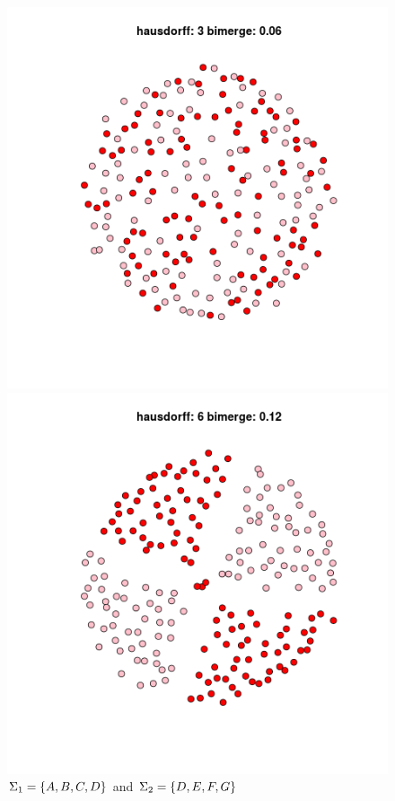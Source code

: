 \begin{figure}
\centering
\begin{minipage}{0.45\textwidth}
\centering
  \includegraphics[scale=0.5]{images/AD6-AD6-100-IM.png}
  \caption{\(\Sigma_1 = \Sigma_2 = \braces{A, B, C, D}\)}
  \label{ad6ad6}
\end{minipage}
\begin{minipage}{0.45\textwidth}
\centering
  \includegraphics[scale=0.5]{images/AD6-DG6-100-IM.png}
  \caption{\(\Sigma_1 = \left\{A, B, C, D\right\}\) and
            \(\Sigma_2 = \left\{D, E, F, G\right\}\)}
  \label{ad6dg6}
\end{minipage}
\end{figure}

